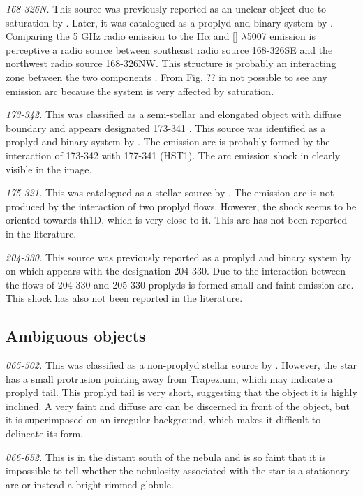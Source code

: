 \documentclass[apj, twocolumn]{aastex63}
\newcommand\oiii{[\ion{O}{3}]}
\newcommand\ha{\ensuremath{\mathrm{H\alpha}}}
\renewcommand\clearpage{}
\begin{document}
\textit{168-326N.} This source was previously reported as an unclear object
due to saturation by \citet{ODell:1994a}. Later, it was catalogued as a proplyd
and binary system by \citet{Ricci:2008a}. Comparing the 5 GHz radio emission
to the \ha{} and \oiii{} $\lambda$5007 emission is perceptive a radio source
between southeast radio source 168-326SE and the northwest radio source
168-326NW. This structure is probably an interacting zone between the two
components \citep{Graham:2002a}. From Fig. ?? in not possible to see
any emission arc because the system is very affected by saturation.    

\textit{173-342.} This was classified as a semi-stellar and elongated
object with diffuse boundary and appears designated 173-341 \citet{ODell:1994a}.
This source was identified as a proplyd and binary system by \citet{Ricci:2008a}.
The emission arc is probably formed by the interaction of 173-342 with
177-341 (HST1). The arc emission shock in clearly visible in the image. 

\textit{175-321.} This was catalogued as a stellar source by \citet{ODell:1996a}.
The emission arc is not produced by the interaction of two proplyd flows. However,
the shock seems to be oriented towards th1D, which is very close to it. This arc
has not been reported in the literature.

\textit{204-330.} This source was previously reported as a proplyd and binary
system by \citet{Ricci:2008a} on which appears with the designation 204-330.
Due to the interaction between the flows of 204-330 and 205-330 proplyds is
formed small and faint emission arc. This shock has also not been reported
in the literature.

\clearpage
\subsection{Ambiguous objects}
\label{sec:problematic-objects}

\textit{065-502.} This was classified as a non-proplyd stellar source
by \citet{ODell:1996a}. However, the star has a small protrusion
pointing away from Trapezium, which may indicate a proplyd tail. This
proplyd tail is very short, suggesting that the object it is highly
inclined.  A very faint and diffuse arc can be discerned in front of
the object, but it is superimposed on an irregular background, which
makes it difficult to delineate its form.

\textit{066-652.}  This is in the distant south of the nebula and is
so faint that it is impossible to tell whether the nebulosity
associated with the star is a stationary arc or instead a
bright-rimmed globule. 
\end{document}
